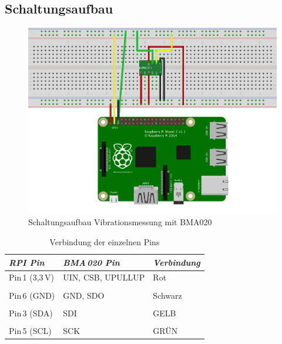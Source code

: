 \subsection{Schaltungsaufbau}
\label{subsection_Schaltungsaufbau_BMA020}

\begin{figure}[!h] 
  \centering
     \includegraphics[scale=.8]{BilderAllgemein/Schaltung_Vib.png}
  \caption{Schaltungsaufbau Vibrationsmessung mit  BMA020}
  \label{Abb_Schaltungsaufbau_BMA020}
\end{figure}

\begin{table}[H]
\centering
\begin{tabular}{
lll
}
\toprule

\multicolumn{1}{p{3cm}}{\textit{\ac{RPI}\;3 Pin}} & \multicolumn{1}{p{4.5cm}}{\textit{BMA\,020 Pin} }&\multicolumn{1}{p{3cm}}{\textit{Verbindung}}\\\midrule
Pin\,1 (3,3\,V) & UIN, CSB, UPULLUP & Rot\\
&&\\
Pin\,6 (GND) &GND, SDO & Schwarz\\
&&\\
Pin\,3 (SDA) &SDI &GELB\\
&&\\
Pin\,5 (SCL)&SCK& GRÜN\\ 
\bottomrule
\end{tabular}
\caption{Verbindung der einzelnen Pins}
\label{Verbindung der einzelnen Pins BMA020}
\end{table}


